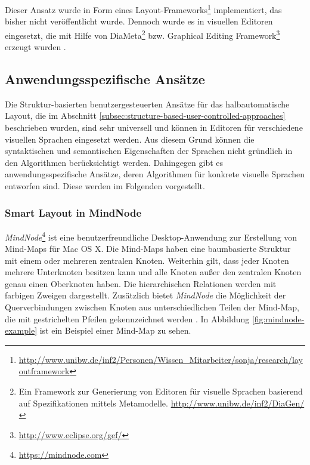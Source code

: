 





Dieser Ansatz wurde in Form eines Layout-Frameworks\footnote{\url{http://www.unibw.de/inf2/Personen/Wissen_Mitarbeiter/sonja/research/layoutframework}} implementiert, das bisher nicht veröffentlicht wurde. Dennoch wurde es in visuellen Editoren eingesetzt, die mit Hilfe von DiaMeta\footnote{Ein Framework zur Generierung von Editoren für visuelle Sprachen basierend auf Spezifikationen mittels Metamodelle. \url{http://www.unibw.de/inf2/DiaGen/}} bzw. Graphical Editing Framework\footnote{\url{http://www.eclipse.org/gef/}} erzeugt wurden \cite{Maier12A-Pattern-based}.

\subsection{Anwendungsspezifische Ansätze}

Die Struktur-basierten benutzergesteuerten Ansätze für das halbautomatische Layout, die im Abschnitt \ref{subsec:structure-based-user-controlled-approaches} beschrieben wurden, sind sehr universell und können in Editoren für verschiedene visuellen Sprachen eingesetzt werden. Aus diesem Grund können die syntaktischen und semantischen Eigenschaften der Sprachen nicht gründlich in den Algorithmen berücksichtigt werden. Dahingegen gibt es anwendungsspezifische Ansätze, deren Algorithmen für konkrete visuelle Sprachen entworfen sind. Diese werden im Folgenden vorgestellt.

\subsubsection{Smart Layout in MindNode}
\label{subsubsec:smart-layout-in-mindnode}

\textit{MindNode}\footnote{\url{https://mindnode.com}} ist eine benutzerfreundliche Desktop-Anwendung zur Erstellung von Mind-Maps für Mac OS X. Die Mind-Maps haben eine baumbasierte Struktur mit einem oder mehreren zentralen Knoten. Weiterhin gilt, dass jeder Knoten mehrere Unterknoten besitzen kann und alle Knoten außer den zentralen Knoten genau einen Oberknoten haben. Die hierarchischen Relationen werden mit farbigen Zweigen dargestellt. Zusätzlich bietet \textit{MindNode} die Möglichkeit der Querverbindungen zwischen Knoten aus unterschiedlichen Teilen der Mind-Map, die mit gestrichelten Pfeilen gekennzeichnet werden \cite{14MindNode}. In Abbildung \ref{fig:mindnode-example} ist ein Beispiel einer Mind-Map zu sehen.

